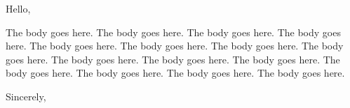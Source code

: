 \documentclass{letter}
\begin{document}
\begin{letter}{}
\opening{Hello,}
The body goes here. The body goes here. The body goes here. The body goes here. The body goes here. The body goes here. The body goes here. The body goes here. The body goes here. The body goes here. The body goes here. The body goes here. The body goes here. The body goes here. The body goes here.
\closing{Sincerely,}
\end{letter}
\end{document}
